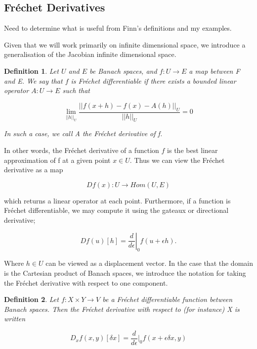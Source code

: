 \documentclass{article}
\newtheorem{definition}{Definition}
\newcommand{\ep}{\epsilon}
\begin{document}
\subsection{Fr\'echet Derivatives}
Need to determine what is useful from Finn's definitions and my examples. 
{\color{blue}
Given that we will work primarily on infinite dimensional space, we introduce a generalisation of the Jacobian infinite dimensional space.

\begin{definition}
    Let $U$ and $E$ be Banach spaces, and $f:U \to E$ a map between F and E. We say that $f$ is Fr\'echet differentiable if there exists a bounded linear operator $A: U\to E$ such that

    \begin{equation}
    \lim_{||h||_U}\frac{||f(x+h)-f(x) - A(h)||_U}{||h||_U} = 0 
    \end{equation}

   In such a case, we call A the Fr\'echet derivative of f. 
\end{definition}

In other words, the Fr\'echet derivative of a function $f$ is the best linear approximation of f at a given point $x\in U$. Thus we can view the Fr\'echet derivative as a map

\begin{equation}
    Df(x): U\to Hom(U,E)
\end{equation}

which returns a linear operator at each point. Furthermore, if a function is Fr\'echet differentiable, we may compute it using the gateaux or directional derivative;

\begin{equation} \label{frechet}
    Df(u)[h] = \left. \frac{d}{d\ep} \right|_0 f(u+\ep h). 
\end{equation}

Where $h\in U$ can be viewed as a displacement vector. In the case that the domain is the Cartesian product of Banach spaces, we introduce the notation for taking the Fr\'echet derivative with respect to one component.

\begin{definition}
    Let $f:X\times Y \to V $ be a Fr\'echet differentiable function between Banach spaces. Then the Fr\'echet derivative with respect to (for instance) X is written

\begin{equation}
    D_xf(x,y)[\delta x] = \frac{d}{d\ep} \bigg|_0 f(x + \ep\delta x, y) 
\end{equation}
\end{definition} 
}
\end{document}
